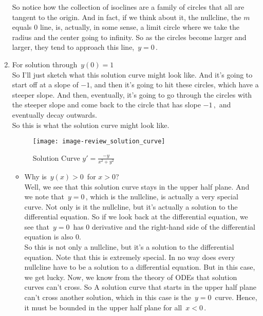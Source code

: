 \begin{enumerate}
  So notice how the collection of isoclines are a family of circles that all are tangent to the origin.
  And in fact, if we think about it, the nullcline,
  the $m$ equals $0$ line, is, actually, in some sense, a limit circle where we take the radius
  and the center going to infinity.
  So as the circles become larger and larger, they tend to approach this line, $\, y = 0\,$.

  \clearpage

\item For solution through $\, y(0) =1$\\

  So I'll just sketch what this solution curve might look like.
  And it's going to start off at a slope of $-1$,
  and then it's going to hit these circles, which have a steeper slope.
  And then, eventually, it's going to go   through the circles with the steeper slope
  and come back to the circle that has slope $-1\, ,$  and eventually decay outwards.\\
  So this is what the solution curve might look like.

  \begin{figure}[ht!]
    \centering
    \texttt{[image: image-review\_solution\_curve]}
    \caption{Solution Curve $y' = \frac{-y}{x^2 + y^2}$}
  \end{figure}

  \begin{itemize}
  \item Why is $\,y(x) > 0 \,$ for $x > 0$? \\
    Well, we see that this solution curve stays in the upper half plane.
    And we note that $\, y = 0 \,$, which is the nullcline, is actually a very special curve.
    Not only is it the nullcline, but it's actually a solution  to the differential equation.
    So if we look back at the differential equation,
    we see that $\, y = 0 \,$ has $0$ derivative and the right-hand side of the differential equation
    is also $0$.\\
    So this is not only a nullcline, but it's a solution to the differential equation.
    Note that this is extremely special.
    In no way does every nullcline have  to be a solution to a differential equation.
    But in this case, we get lucky.
    Now, we know from the theory of ODEs that solution curves can't cross.
    So A solution curve that starts in the upper half plane
    can't cross another solution, which in this case is the $\, y = 0 \,$ curve.
    Hence, it must be bounded in the upper half plane for all $\, x < 0\, $.


\end{itemize}
\end{enumerate}
